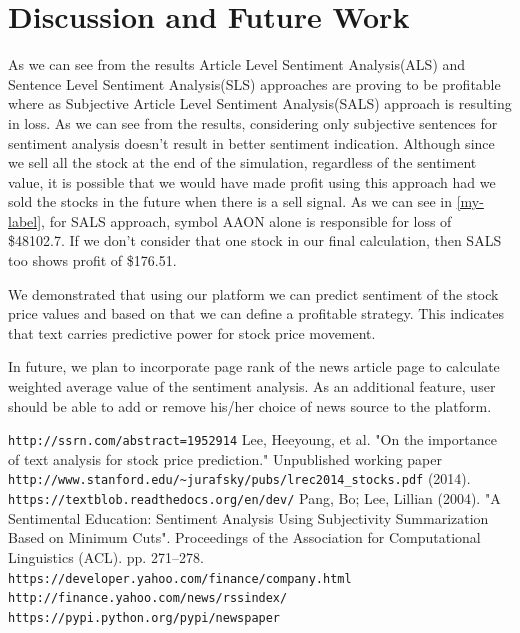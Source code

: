 \documentclass[a4paper,11pt]{article}
\begin{document}
\section{Discussion and Future Work}
As we can see from the results Article Level Sentiment Analysis(ALS) and Sentence Level Sentiment Analysis(SLS) approaches are proving to be profitable where as Subjective Article Level Sentiment Analysis(SALS) approach is resulting in loss. As we can see from the results, considering only subjective sentences for sentiment analysis doesn't result in better sentiment indication. Although since we sell all the stock at the end of the simulation, regardless of the sentiment value, it is possible that we would have made profit using this approach had we sold the stocks in the future when there is a sell signal. As we can see in \ref{my-label}, for SALS approach, symbol AAON alone is responsible for loss of \$48102.7. If we don't consider that one stock in our final calculation, then SALS too shows profit of \$176.51.
\par We demonstrated that using our platform we can predict sentiment of the stock price values and based on that we can define a profitable strategy. This indicates  that  text  carries  predictive  power  for  stock  price movement.
\par In future, we plan to incorporate page rank of the news article page to calculate weighted average value of the sentiment analysis. As an additional feature, user should be able to add or remove his/her choice of news source to the platform.
\begin{thebibliography}{9}
\texttt{http://ssrn.com/abstract=1952914}
Lee, Heeyoung, et al. "On the importance of text analysis for stock price prediction." Unpublished working paper \\\texttt{http://www.stanford.edu/\~{}jurafsky/pubs/lrec2014\_stocks.pdf} (2014).
\texttt{https://textblob.readthedocs.org/en/dev/}
Pang, Bo; Lee, Lillian (2004). "A Sentimental Education: Sentiment Analysis Using Subjectivity Summarization Based on Minimum Cuts". Proceedings of the Association for Computational Linguistics (ACL). pp. 271–278.
\texttt{https://developer.yahoo.com/finance/company.html}
\texttt{http://finance.yahoo.com/news/rssindex/}
\texttt{https://pypi.python.org/pypi/newspaper}
\end{thebibliography}
\end{document}

